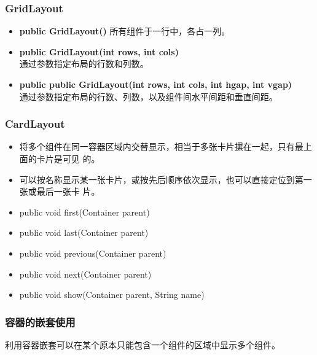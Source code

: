 \begin{frame}[fragile] %
  \frametitle{GridLayout}
  
  \begin{itemize}\kai
  \item {\bf public GridLayout()}  所有组件于一行中，各占一列。
  \item {\bf public GridLayout(int rows, int cols)}\\
    通过参数指定布局的行数和列数。
  \item {\bf public public GridLayout(int rows, int cols, int hgap, int vgap)}\\
    通过参数指定布局的行数、列数，以及组件间水平间距和垂直间距。
  \end{itemize}

\end{frame}

\begin{frame}[fragile] %
  \frametitle{CardLayout}

  \begin{itemize}
  \item 将多个组件在同一容器区域内交替显示，相当于多张卡片摞在一起，只有最上面的卡片是可见
    的。
  \item 可以按名称显示某一张卡片，或按先后顺序依次显示，也可以直接定位到第一张或最后一张卡
    片。
  \end{itemize}

  \begin{itemize}
  \item public void first(Container parent)
  \item public void last(Container parent)
  \item public void previous(Container parent)
  \item public void next(Container parent)
  \item public void show(Container parent, String name)
  \end{itemize}

  
\end{frame}


\begin{frame}[fragile] %
  \frametitle{容器的嵌套使用}

  利用容器嵌套可以在某个原本只能包含一个组件的区域中显示多个组件。

\end{frame}

